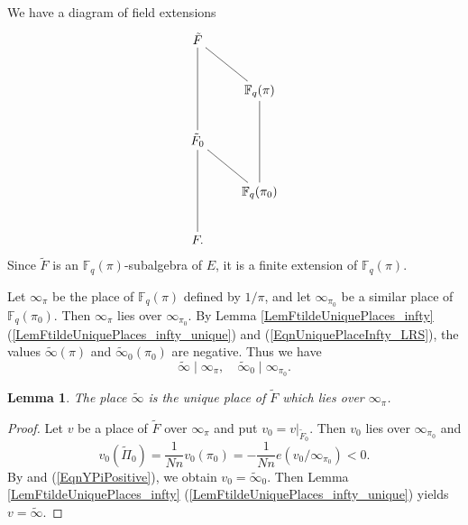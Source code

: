 \documentclass[10pt]{amsart}
\theoremstyle{plain}
\newtheorem{lem}[thm]{Lemma}
\theoremstyle{definition}
\newcommand{\bF}{\mathbb{F}}
\newcommand{\fry}{\mathfrak{y}}
\begin{document}

We have a diagram of field extensions
\[
\xymatrix{
	\tilde{F}\ar@{-}[dd]\ar@{-}[dr] & \\
	& \bF_q(\pi)\ar@{-}[dd]\\
	\tilde{F}_0\ar@{-}[dd]\ar@{-}[dr] &\\
	& \bF_q(\pi_0)\\
	F. &
}
\]
Since $\tilde{F}$ is an $\bF_q(\pi)$-subalgebra of $E$, it is a finite extension of $\bF_q(\pi)$.

Let $\infty_{\pi}$ be the place of $\bF_q(\pi)$ defined by $1/\pi$, and let $\infty_{\pi_0}$ be a similar place of
$\bF_q(\pi_0)$. Then $\infty_\pi$ lies over $\infty_{\pi_0}$.
By Lemma \ref{LemFtildeUniquePlaces_infty} (\ref{LemFtildeUniquePlaces_infty_unique}) and (\ref{EqnUniquePlaceInfty_LRS}),
the values $\tilde{\infty}(\pi)$ and $\tilde{\infty}_0(\pi_0)$ are negative. Thus we have 
\[
\tilde{\infty}\mid\infty_{\pi},\quad \tilde{\infty}_0\mid\infty_{\pi_0}.
\]

\begin{lem}\label{LemPlaceInftyPiUnique}
	The place $\tilde{\infty}$ is the unique place of $\tilde{F}$ which lies over $\infty_\pi$.
\end{lem}
\begin{proof}
	Let $v$ be a place of $\tilde{F}$ over $\infty_\pi$ and put $v_0=v|_{\tilde{F}_0}$.
	Then $v_0$ lies over $\infty_{\pi_0}$ and
	\[
	v_0(\tilde{\Pi}_0)=\frac{1}{N n}v_0(\pi_0)=-\frac{1}{N n}e(v_0/\infty_{\pi_0})<0.
	\]
	By \cite[Proposition 9.9 (iii)]{LRS} and (\ref{EqnYPiPositive}), we obtain 
	$v_0=\tilde{\infty}_0$. Then Lemma \ref{LemFtildeUniquePlaces_infty} (\ref{LemFtildeUniquePlaces_infty_unique}) yields $v=\tilde{\infty}$.
\end{proof}
\end{document}
